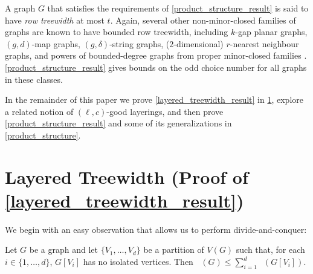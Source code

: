 \documentclass{patmorin}
\DeclareMathOperator{\odd}{\chi_o}
\begin{document}
A graph $G$ that satisfies the requirements of \cref{product_structure_result} is said to have \emph{row treewidth} at most $t$.  Again, several other non-minor-closed families of graphs are known to have bounded row treewidth, including $k$-gap planar graphs, $(g,d)$-map graphs, $(g,\delta)$-string graphs, ($2$-dimensional) $r$-nearest neighbour graphs, and powers of bounded-degree graphs from proper minor-closed families \cite{dujmovic.morin.ea:structure,hickingbotham.wood:shallow}. \cref{product_structure_result} gives bounds on the odd choice number for all graphs in these classes.
%
%
%
%

In the remainder of this paper we prove \cref{layered_treewidth_result} in \cref{layered_treewidth}, explore a related notion of $(\ell,c)$-good layerings, and then prove \cref{product_structure_result} and some of its generalizations in \cref{product_structure}.

\section{Layered Treewidth (Proof of \cref{layered_treewidth_result})}
\label{layered_treewidth}

We begin with an easy observation that allows us to perform divide-and-conquer:

\begin{obs}\label{partition}
  Let $G$ be a graph and let $\{V_1,\ldots,V_d\}$ be a partition of $V(G)$ such that, for each $i\in\{1,\ldots,d\}$, $G[V_i]$ has no isolated vertices.  Then $\odd(G) \le \sum_{i=1}^d \odd(G[V_i])$.
\end{obs}
\end{document}
